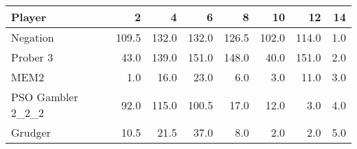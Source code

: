 \begin{tabular}{lrrrrrrr}
\toprule
            Player &      2 &      4 &      6 &      8 &     10 &     12 &   14 \\
\midrule
          Negation &  109.5 &  132.0 &  132.0 &  126.5 &  102.0 &  114.0 &  1.0 \\
          Prober 3 &   43.0 &  139.0 &  151.0 &  148.0 &   40.0 &  151.0 &  2.0 \\
              MEM2 &    1.0 &   16.0 &   23.0 &    6.0 &    3.0 &   11.0 &  3.0 \\
 PSO Gambler 2\_2\_2 &   92.0 &  115.0 &  100.5 &   17.0 &   12.0 &    3.0 &  4.0 \\
           Grudger &   10.5 &   21.5 &   37.0 &    8.0 &    2.0 &    2.0 &  5.0 \\
\bottomrule
\end{tabular}
